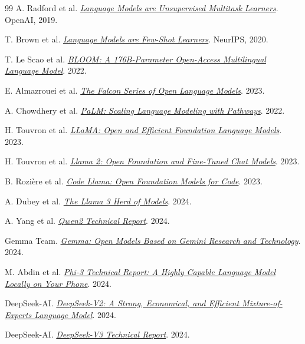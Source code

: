 \documentclass[UTF8,fontset=none,a4paper,10pt]{ctexart}
\begin{document}
\begin{thebibliography}{99}
A. Radford et al. \href{https://cdn.openai.com/better-language-models/language_models_are_unsupervised_multitask_learners.pdf}{\textit{Language Models are Unsupervised Multitask Learners}}. OpenAI, 2019.

T. Brown et al. \href{https://arxiv.org/abs/2005.14165}{\textit{Language Models are Few-Shot Learners}}. NeurIPS, 2020.

T. Le Scao et al. \href{https://arxiv.org/abs/2211.05100}{\textit{BLOOM: A 176B-Parameter Open-Access Multilingual Language Model}}. 2022.

E. Almazrouei et al. \href{https://arxiv.org/abs/2311.16867}{\textit{The Falcon Series of Open Language Models}}. 2023.

A. Chowdhery et al. \href{https://arxiv.org/abs/2204.02311}{\textit{PaLM: Scaling Language Modeling with Pathways}}. 2022.

H. Touvron et al. \href{https://arxiv.org/abs/2302.13971}{\textit{LLaMA: Open and Efficient Foundation Language Models}}. 2023.

H. Touvron et al. \href{https://arxiv.org/abs/2307.09288}{\textit{Llama 2: Open Foundation and Fine-Tuned Chat Models}}. 2023.

B. Rozière et al. \href{https://arxiv.org/abs/2308.12950}{\textit{Code Llama: Open Foundation Models for Code}}. 2023.

A. Dubey et al. \href{https://arxiv.org/abs/2407.21783}{\textit{The Llama 3 Herd of Models}}. 2024.

A. Yang et al. \href{https://arxiv.org/abs/2407.10671}{\textit{Qwen2 Technical Report}}. 2024.

Gemma Team. \href{https://arxiv.org/abs/2403.08295}{\textit{Gemma: Open Models Based on Gemini Research and Technology}}. 2024.

M. Abdin et al. \href{https://arxiv.org/abs/2404.14219}{\textit{Phi-3 Technical Report: A Highly Capable Language Model Locally on Your Phone}}. 2024.

DeepSeek-AI. \href{https://arxiv.org/abs/2405.04434}{\textit{DeepSeek-V2: A Strong, Economical, and Efficient Mixture-of-Experts Language Model}}. 2024.

DeepSeek-AI. \href{https://arxiv.org/abs/2412.19437}{\textit{DeepSeek-V3 Technical Report}}. 2024.


\end{thebibliography}
\end{document}
